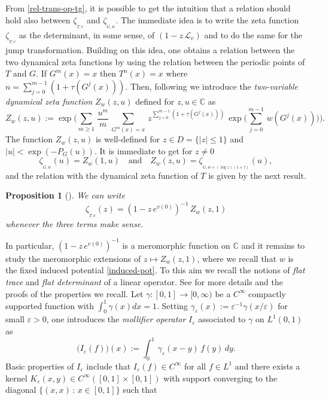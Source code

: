 \documentclass[11pt]{amsart}
\newtheorem{proposition}[theorem]{Proposition}
\theoremstyle{definition}
\theoremstyle{remark}
\theoremstyle{definition}
\numberwithin{equation}{section}
\newcommand{\C}{\mathbb C}
\newcommand{\eps}{\varepsilon}
\newcommand{\LL}{\mathcal{L}}
\newcommand{\dynzeta}[1]{\zeta_{_{#1}}}
\begin{document}
From \eqref{rel-trans-op-tg}, it is possible to get the intuition that a relation should hold also between $\dynzeta{T,v}$ and $\dynzeta{G,w}$. The immediate idea is to write the zeta function $\dynzeta{T,v}$ as the determinant, in some sense, of $(1-z\, \LL_v)$ and to do the same for the jump transformation. Building on this idea, one obtains a relation between the two dynamical zeta functions by using the relation between the periodic points of $T$ and $G$. If $G^m(x)=x$ then $T^n(x)=x$ where $n=\sum_{j=0}^{m-1} (1+\tau(G^j(x)))$. Then, following \cite{PY,Is1} we introduce the \emph{two-variable dynamical zeta function} $Z_w(z,u)$ defined for $z,u \in \C$ as
\begin{equation}\label{2var-zeta}
Z_w(z,u) := \exp \Big( \sum_{m\ge 1}\, \frac{u^m}m\, \sum_{G^m(x)=x}\, z^{\sum_{j=0}^{m-1} (1+\tau(G^j(x)))}\, \exp\Big(\sum_{j=0}^{m-1}\, w(G^j(x))\Big) \Big).
\end{equation}
The function $Z_w(z,u)$ is well-defined for $z\in D= \{ |z| \le 1\}$ and $|u|< \exp(-P_G(u))$. It is immediate to get for $z\not= 0$
\begin{equation}\label{2var-zeta-relations}
\dynzeta{G,w}(u) = Z_w(1,u) \quad \text{and} \quad Z_w(z,u) = \dynzeta{G,w+(\log z)(1+\tau)}(u),
\end{equation} 
and the relation with the dynamical zeta function of $T$ is given by the next result.
\begin{proposition}[\cite{PY,Is1}] \label{prop:standard}
We can write
\begin{equation}\label{rel-zeta-t-fund}
\dynzeta{T,v}(z) = (1-z\, e^{v(0)})^{-1}\, Z_w(z,1)
\end{equation}
whenever the three terms make sense.
\end{proposition}
In particular, $(1-z\, e^{v(0)})^{-1}$ is a meromorphic function on $\C$ and it remains to study the meromorphic extensions of {$z\mapsto Z_w(z,1)$, where we recall that $w$ is the fixed induced potential \eqref{induced-pot}}. To this aim we recall the notions of \emph{flat trace} and \emph{flat determinant} of a linear operator. See \cite[Section 3.2.2]{bal-book-2} for more details and the proofs of the properties we recall. Let $\gamma : [0,1] \to [0,\infty)$ be a $C^\infty$ compactly supported function with $\int_0^1 \gamma(x) dx =1$. Setting $\gamma_\eps(x) := \eps^{-1} \gamma(x/\eps)$ for small $\eps>0$, one introduces the \emph{mollifier operator} $I_\eps$ associated to $\gamma$ on $L^1(0,1)$ as
\[
\Big(I_\eps(f)\Big)(x) := \int_0^1\, \gamma_\eps(x-y)\, f(y)\, dy.
\]
Basic properties of $I_\eps$ include that $I_\eps(f) \in C^\infty$ for all $f\in L^1$ and there exists a kernel $K_\eps(x,y) \in C^\infty([0,1]\times [0,1])$ with support converging to the diagonal $\{(x,x)\, :\, x\in [0,1]\}$ such that
\end{document}
